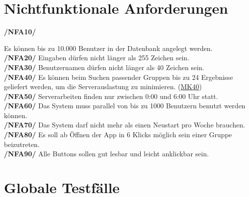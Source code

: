 \documentclass[a4paper]{scrreprt}
\begin{document}
\chapter{Nichtfunktionale Anforderungen}

\begin{addmargin}[25pt]{0pt} 

\hypertarget{nfa10}{\textbf{/NFA10/}} Es können bis zu 10.000 Benutzer in der Datenbank angelegt werden.\\
\hypertarget{nfa20}{\textbf{/NFA20/}} Eingaben dürfen nicht länger als 255 Zeichen sein.\\
\hypertarget{nfa30}{\textbf{/NFA30/}} Benutzernamen dürfen nicht länger als 40 Zeichen sein.\\
\hypertarget{nfa40}{\textbf{/NFA40/}} Es können beim Suchen passender Gruppen bis zu 24 Ergebnisse geliefert werden, um die Serverauslastung zu minimieren. (\hyperlink{m40}{MK40})\\
\hypertarget{nfa50}{\textbf{/NFA50/}} Serverarbeiten finden nur zwischen 0:00 und 6:00 Uhr statt.\\
\hypertarget{nfa60}{\textbf{/NFA60/}} Das System muss parallel von bis zu 1000 Benutzern benutzt werden können.\\
\hypertarget{nfa70}{\textbf{/NFA70/}} Das System darf nicht mehr als einen Neustart pro Woche brauchen.\\
\hypertarget{nfa80}{\textbf{/NFA80/}} Es soll ab Öffnen der App in 6 Klicks möglich sein einer Gruppe beizutreten.\\
\hypertarget{nfa90}{\textbf{/NFA90/}} Alle Buttons sollen gut lesbar und leicht anklickbar sein.\\

\end{addmargin}


\chapter{Globale Testfälle}
\end{document}
